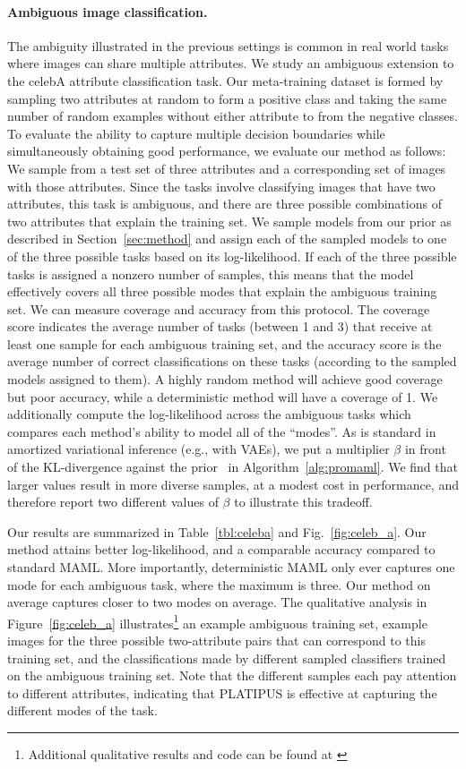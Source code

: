 \documentclass{article}
\begin{document}
\paragraph{Ambiguous image classification.}
The ambiguity illustrated in the previous settings is common in real world tasks where images can share multiple attributes. We study an ambiguous extension to the celebA attribute classification task. Our meta-training dataset is formed by sampling two attributes at random to form a positive class and taking the same number of random examples without either attribute to from the negative classes. 
To evaluate the ability to capture multiple decision boundaries while simultaneously obtaining good performance, we evaluate our method as follows: We sample from a test set of three attributes and a corresponding set of images with those attributes. Since the tasks involve classifying images that have two attributes, this task is ambiguous, and there are three possible combinations of two attributes that explain the training set. We sample models from our prior as described in Section~\ref{sec:method} and assign each of the sampled models to one of the three possible tasks based on its log-likelihood. If each of the three possible tasks is assigned a nonzero number of samples, this means that the model effectively covers all three possible modes that explain the ambiguous training set. We can measure coverage and accuracy from this protocol. The coverage score indicates the average number of tasks (between 1 and 3) that receive at least one sample for each ambiguous training set, and the accuracy score is the average number of correct classifications on these tasks (according to the sampled models assigned to them). A highly random method will achieve good coverage but poor accuracy, while a deterministic method will have a coverage of 1. We additionally compute the log-likelihood across the ambiguous tasks which compares each method's ability to model all of the ``modes''. As is standard in amortized variational inference (e.g., with VAEs), we put a multiplier $\beta$ in front of the KL-divergence against the prior~\cite{higgins2017early} in Algorithm~\ref{alg:promaml}. We find that larger values result in more diverse samples, at a modest cost in performance, and therefore report two different values of $\beta$ to illustrate this tradeoff.

Our results are summarized in Table~\ref{tbl:celeba} and Fig.~\ref{fig:celeb_a}. Our method attains better log-likelihood, and a comparable accuracy compared to standard MAML. More importantly, deterministic MAML only ever captures one mode for each ambiguous task, where the maximum is three. Our method on average captures closer to two modes on average. The qualitative analysis in Figure~\ref{fig:celeb_a} illustrates\footnote{Additional qualitative results and code can be found at \hyperlink{\website}{\website}} an example ambiguous training set, example images for the three possible two-attribute pairs that can correspond to this training set, and the classifications made by different sampled classifiers trained on the ambiguous training set. Note that the different samples each pay attention to different attributes, indicating that PLATIPUS is effective at capturing the different modes of the task.
\end{document}
